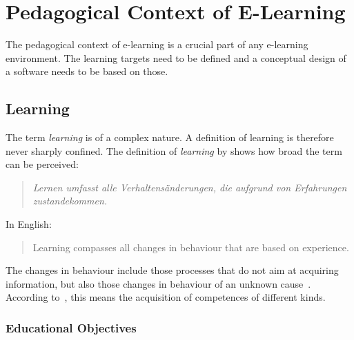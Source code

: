\section{Pedagogical Context of E-Learning}
\label{sec:elearn:pedagogicalcontext}

The pedagogical context of e-learning is a crucial part of any e-learning
environment. The learning targets need to be defined and a conceptual design
of a software needs to be based on those.

\subsection{Learning}
\label{sec:elearn:learning}

The term \emph{learning} is of a complex nature. A definition of learning is
therefore never sharply confined. The definition of \emph{learning} by 
 \citeyear{Lefrancois1994} shows how broad
the term can be perceived:
\begin{quote}
  \emph{Lernen umfasst alle Verhaltensänderungen, 
        die aufgrund von Erfahrungen zustandekommen.}
\end{quote}
In English:
\begin{quote}
 Learning compasses all changes in behaviour that are based on experience.
\end{quote}
The changes in behaviour include those processes that do not aim at acquiring
information, but also those changes in behaviour of an unknown 
cause~. According to~,
this means the acquisition of competences of different kinds.

\subsubsection{Educational Objectives}
\label{sec:elearn:learningaims}

